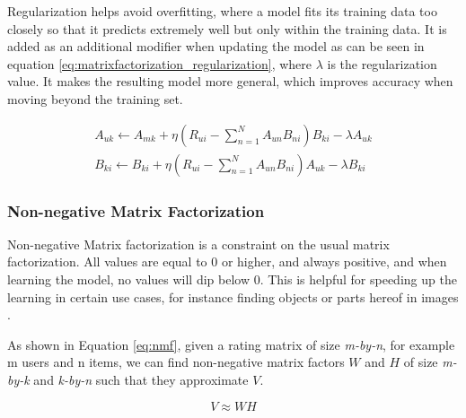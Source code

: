 Regularization helps avoid overfitting, where a model fits its training data too closely so that it predicts extremely well but only within the training data. It is added as an additional modifier when updating the model as can be seen in equation \ref{eq:matrixfactorization_regularization}, where $\lambda$ is the regularization value. It makes the resulting model more general, which improves accuracy when moving beyond the training set.

\begin{equation}\label{eq:matrixfactorization_regularization}
	\begin{split}
	A_{uk}\leftarrow A_{mk} + \eta(R_{ui}-\sum_{n=1}^{N}A_{un}B_{ni})B_{ki}-\lambda A_{uk}
	\\
	B_{ki}\leftarrow B_{ki} + \eta(R_{ui}-\sum_{n=1}^{N}A_{un}B_{ni})A_{uk} -\lambda B_{ki}
	\end{split}
\end{equation}

\subsubsection{Non-negative Matrix Factorization}

Non-negative Matrix factorization is a constraint on the usual matrix factorization. All values are equal to 0 or higher, and always positive, and when learning the model, no values will dip below 0. This is helpful for speeding up the learning in certain use cases, for instance finding objects or parts hereof in images \cite{nnmf}.

As shown in Equation \ref{eq:nmf}, given a rating matrix of size \textit{m-by-n}, for example m users and n items, we can find non-negative matrix factors $W$ and $H$ of size \textit{m-by-k} and \textit{k-by-n} such that they approximate $V$.

\begin{equation} \label{eq:nmf}
	V \approx W H
\end{equation}

